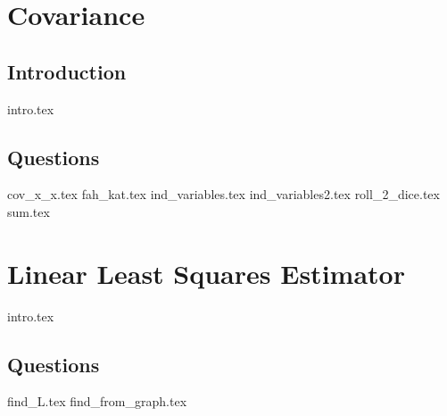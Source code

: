 \documentclass{exam}
\begin{document}
\section{Covariance}
\subsection{Introduction}
{intro.tex}
\subsection{Questions}
\begin{questions}
{cov_x_x.tex}
{fah_kat.tex}
{ind_variables.tex}
{ind_variables2.tex}
{roll_2_dice.tex}
{sum.tex}
\end{questions}

\section{Linear Least Squares Estimator}
{intro.tex}
\subsection{Questions}
\begin{questions}
{find_L.tex}
{find_from_graph.tex}
\end{questions}
\end{document}
